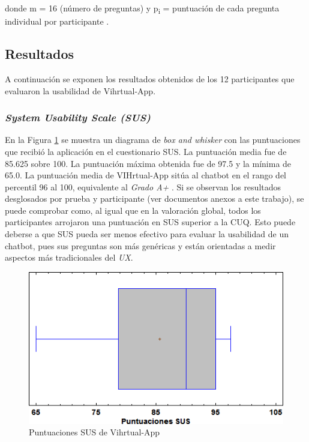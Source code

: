 donde m = 16 (número de preguntas) y p\textsubscript{i} = puntuación de cada pregunta individual por participante \cite{cuq}.\\

\subsection{Resultados}

A continuación se exponen los resultados obtenidos de los 12 participantes que evaluaron la usabilidad de Vihrtual-App.\\

\subsubsection{\textit{System Usability Scale (SUS)}}
En la Figura \ref{fig:susplot} se muestra un diagrama de \textit{box and whisker} con las puntuaciones que recibió la aplicación en el cuestionario SUS. La puntuación media fue de 85.625 sobre 100. La puntuación máxima obtenida fue de 97.5 y la mínima de 65.0. La puntuación media de VIHrtual-App sitúa al chatbot en el rango del percentil 96 al 100, equivalente al \textit{Grado A+} \cite{susResults}. Si se observan los resultados desglosados por prueba y participante (ver documentos anexos a este trabajo), se puede comprobar como, al igual que en la valoración global, todos los participantes arrojaron una puntuación en SUS superior a la CUQ. Esto puede deberse a que SUS pueda ser menos efectivo para evaluar la usabilidad de un chatbot, pues sus preguntas son más genéricas y están orientadas a medir aspectos más tradicionales del \textit{UX}.\\

\begin{figure}[htbp]
\centering
\includegraphics[scale=0.8]{../images/sus.png}
\caption{Puntuaciones SUS de Vihrtual-App}
\label{fig:susplot}
\end{figure}

